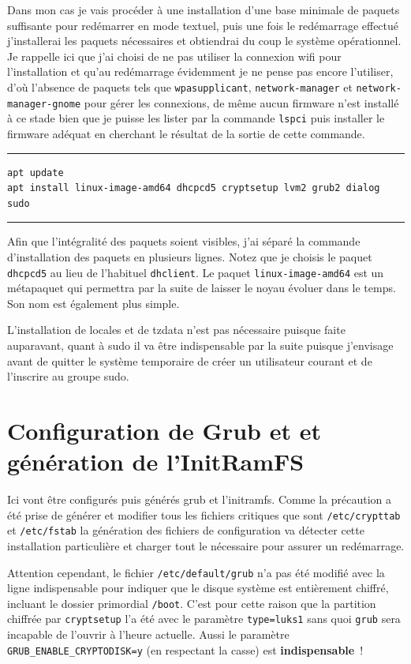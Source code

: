 \documentclass[12pt, a4paper]{report}
\begin{document}
Dans mon cas je vais procéder à une installation d'une base minimale de paquets suffisante pour redémarrer en mode textuel, puis une fois le redémarrage effectué j'installerai les paquets nécessaires et obtiendrai du coup le système opérationnel. 
Je rappelle ici que j'ai choisi de ne pas utiliser la connexion wifi pour l'installation et qu'au redémarrage évidemment je ne pense pas encore l'utiliser, d'où l'absence de paquets tels que \texttt{wpasupplicant}, \texttt{network-manager} et \texttt{network-manager-gnome} pour gérer les connexions, de même aucun firmware n'est installé à ce stade bien que je puisse les lister par la commande \texttt{lspci} puis installer le firmware adéquat en cherchant le résultat de la sortie de cette commande.

\noindent \rule{\linewidth}{0.5pt}
\begin{verbatim}
apt update
apt install linux-image-amd64 dhcpcd5 cryptsetup lvm2 grub2 dialog sudo
\end{verbatim}
\rule{\linewidth}{0.5pt}

Afin que l'intégralité des paquets soient visibles, j'ai séparé la commande d'installation des paquets en plusieurs lignes. 
Notez que je choisis le paquet \texttt{dhcpcd5} au lieu de l'habituel \texttt{dhclient}. 
Le paquet \texttt{linux-image-amd64} est un métapaquet qui permettra par la suite de laisser le noyau évoluer dans le temps. 
Son nom est également plus simple.

L'installation de locales et de tzdata n'est pas nécessaire puisque faite auparavant, quant à sudo il va être indispensable par la suite puisque j'envisage avant de quitter le système temporaire de créer un utilisateur courant et de l'inscrire au groupe sudo.

\section{Configuration de Grub et et génération de l'InitRamFS}

Ici vont être configurés puis générés grub et l'initramfs. 
Comme la précaution a été prise de générer et modifier tous les fichiers critiques que sont \texttt{/etc/crypttab} et \texttt{/etc/fstab} la génération des fichiers de configuration va détecter cette installation particulière et charger tout le nécessaire pour assurer un redémarrage.

Attention cependant, le fichier \texttt{/etc/default/grub} n'a pas été modifié avec la ligne indispensable pour indiquer que le disque système est entièrement chiffré, incluant le dossier primordial \texttt{/boot}. 
C'est pour cette raison que la partition chiffrée par \texttt{cryptsetup} l'a été avec le paramètre \texttt{\-\-type=luks1} sans quoi \texttt{grub} sera incapable de l'ouvrir à l'heure actuelle.
Aussi le paramètre \texttt{GRUB\_ENABLE\_CRYPTODISK=y} (en respectant la casse) est {\bf indispensable}~!
\end{document}
